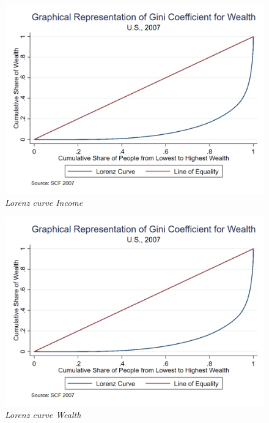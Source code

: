 \documentclass[12pt]{article}%
\begin{document}
\begin{enumerate}
		   \begin{figure}[H]
		\begin{center}
				\includegraphics[width=0.8\linewidth]{build_data/output/Lorenz_wealth}
		\end{center}	
		\caption{\small \sl Lorenz curve Income} 
		\label{fig:Fig2}
	\end{figure}
	

	
	   \begin{figure}[H]
		\begin{center}
				\includegraphics[width=0.8\linewidth]{build_data/output/Lorenz_wealth}
		\end{center}	
		\caption{\small \sl Lorenz curve Wealth} 
		\label{fig:Fig2}
	\end{figure}
	
	
	
\end{enumerate}

\strut

\onehalfspacing
\end{document}
